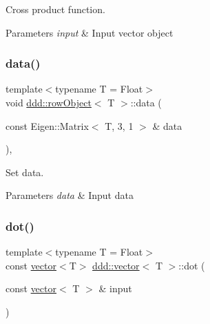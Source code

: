 Cross product function. 


\begin{DoxyParams}{Parameters}
{\em input} & Input vector object \\
\hline
\end{DoxyParams}
\mbox{\label{classddd_1_1row_object_ae90cbcdfbe32788d18f051a78f8188a6}} 
\subsubsection{\texorpdfstring{data()}{data()}}
{\footnotesize\ttfamily template$<$typename T  = Float$>$ \\
void \hyperlink{classddd_1_1row_object}{ddd\+::row\+Object}$<$ T $>$\+::data (\begin{DoxyParamCaption}\item[{const Eigen\+::\+Matrix$<$ T, 3, 1 $>$ \&}]{data }\end{DoxyParamCaption})\hspace{0.3cm}{\ttfamily [inline]}, {\ttfamily [inherited]}}



Set data. 


\begin{DoxyParams}{Parameters}
{\em data} & Input data \\
\hline
\end{DoxyParams}
\mbox{\label{classddd_1_1vector_a61e3ccdb85f4d41c142c80b429808baf}} 
\subsubsection{\texorpdfstring{dot()}{dot()}}
{\footnotesize\ttfamily template$<$typename T = Float$>$ \\
const \hyperlink{classddd_1_1vector}{vector}$<$T$>$ \hyperlink{classddd_1_1vector}{ddd\+::vector}$<$ T $>$\+::dot (\begin{DoxyParamCaption}\item[{const \hyperlink{classddd_1_1vector}{vector}$<$ T $>$ \&}]{input }\end{DoxyParamCaption})\hspace{0.3cm}{\ttfamily [inline]}}



